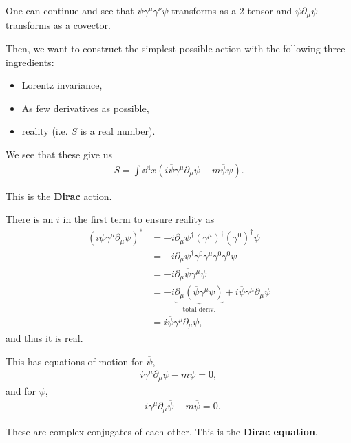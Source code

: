 One can continue and see that $\overline{\psi} \gamma^{\mu} \gamma^{\nu} \psi$ transforms as a 2-tensor and $\overline{\psi} \partial_\mu \psi$ transforms as a covector.

Then, we want to construct the simplest possible action with the following three ingredients:
\begin{itemize}
    \item Lorentz invariance,
    \item As few derivatives as possible,
    \item reality (i.e. $S$ is a real number).
\end{itemize}

We see that these give us
\begin{align}
    S = \int \dd{^{4}x} \left( i\overline{\psi} \gamma^{\mu} \partial_\mu \psi - m \overline{\psi} \psi \right)  
.\end{align}

This is the \textbf{Dirac} action.

\begin{note}
    There is an $i$ in the first term to ensure reality as
    \begin{align}
        \left( i\overline{\psi} \gamma^{\mu} \partial_\mu \psi \right)^{*} &= -i \partial_\mu \psi^{\dag} \left( \gamma^{\mu} \right)^{\dag} \left( \gamma^{0} \right)^{\dag} \psi \\
        &= -i \partial_\mu \psi^{\dag} \gamma^{0} \gamma^{\mu} \gamma^{0} \gamma^{0} \psi \\
        &= -i \partial_\mu \overline{\psi} \gamma^{\mu} \psi \\
        &= -i \underbrace{\partial_\mu \left( \overline{\psi} \gamma^{\mu} \psi \right)}_{\text{total deriv.}} + i \overline{\psi}\gamma^{\mu} \partial_\mu \psi \\
        &= i \overline{\psi}\gamma^{\mu} \partial_\mu \psi 
    ,\end{align}
    and thus it is real.
\end{note}

This has equations of motion for $\overline{\psi}$,
\begin{align}
    i \gamma^{\mu} \partial_\mu \psi - m \psi = 0
,\end{align}
and for $\psi$,
\begin{align}
    -i \gamma^{\mu} \partial_\mu \overline{\psi} - m \overline{\psi} = 0
.\end{align}

These are complex conjugates of each other. This is the \textbf{Dirac equation}.

